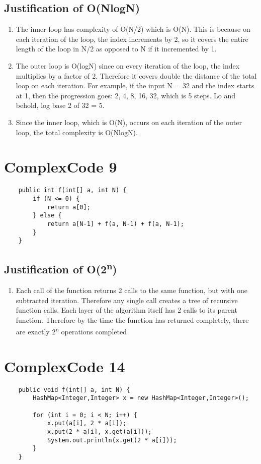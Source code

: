 \documentclass[11pt]{article}
\begin{document}
\subsection{Justification of O(NlogN)}
\begin{enumerate}
  \item The inner loop has complexity of O(N/2) which is O(N). This is because on each iteration of the loop,
  the index increments by 2, so it covers the entire length of the loop in N/2 as opposed to N if it incremented
  by 1.
  \item The outer loop is O(logN) since on every iteration of the loop, the index multiplies by a factor of 2.
  Therefore it covers double the distance of the total loop on each iteration. For example, if the input N = 32 and the
  index starts at 1, then the progression goes: 2, 4, 8, 16, 32, which is 5 steps. Lo and behold,
  log base 2 of 32 = 5.
  \item Since the inner loop, which is O(N), occurs on each iteration of the outer loop,
  the total complexity is O(NlogN).
\end{enumerate}

\section{ComplexCode 9}
\begin{lstlisting}
  	public int f(int[] a, int N) {
		if (N <= 0) {
			return a[0];
		} else {
			return a[N-1] + f(a, N-1) + f(a, N-1);
		}
	}
\end{lstlisting}
\subsection{Justification of O(2\textsuperscript{n})}
\begin{enumerate}
\item Each call of the function returns 2 calls to the same function, but with one subtracted iteration.
Therefore any single call creates a tree of recursive function calls. Each layer of the algorithm itself has
2 calls to its parent function. Therefore by the time the function has returned completely,
there are exactly 2\textsuperscript{n} operations completed 
\end{enumerate}

\section{ComplexCode 14}
\begin{lstlisting}
 	public void f(int[] a, int N) {
		HashMap<Integer,Integer> x = new HashMap<Integer,Integer>();
		
		for (int i = 0; i < N; i++) {
			x.put(a[i], 2 * a[i]);
			x.put(2 * a[i], x.get(a[i]));
			System.out.println(x.get(2 * a[i]));
		}
	}
\end{lstlisting}
\end{document}
